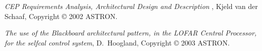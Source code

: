\documentclass[]{lofar}
\begin{document}
  
  \begin{thebibliography}{WIDELABEL}

      \emph{CEP Requirements Analysis, Architectural Design and
      Description} , Kjeld van der Schaaf, Copyright \copyright{} 2002
      ASTRON. \label{LOFAR-ASTRON-MEM-035}

      \emph{The use of the Blackboard architectural pattern, in the LOFAR Central Processor, for the selfcal control system},
      D.\ Hoogland,
      Copyright \copyright{} 2003 ASTRON.
      \label{LOFAR-ASTRON-MEM-096}

  \end{thebibliography}
\end{document}
